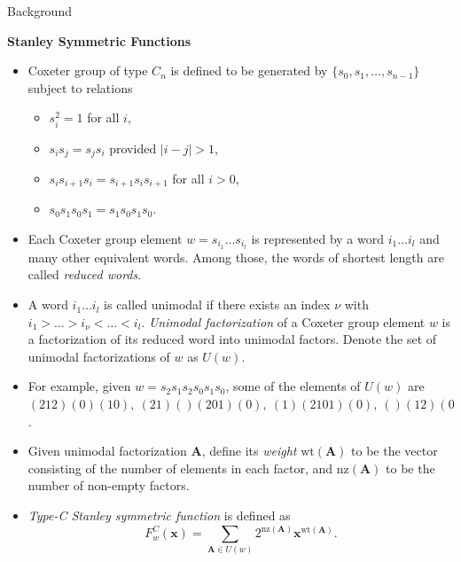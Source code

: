 \documentclass[final]{beamer}
\theoremstyle{definition}
\numberwithin{equation}{section}
\newcommand{\wt}{\mathrm{wt}}
\newcommand{\nz}{\mathrm{nz}}
\newlength{\onecolwid}
\newlength{\twocolwid}
\begin{document}
\begin{frame}[t]
\begin{columns}[t]
\begin{column}{\twocolwid}
\begin{columns}[t]
\begin{column}{\onecolwid}
\begin{block}{Background}

\textbf{Stanley Symmetric Functions}
\begin{itemize}
\item Coxeter group of type $C_n$ is defined to be generated by $\{s_0, s_1, \ldots, s_{n-1}\}$ subject to relations
	\begin{itemize}
	\item $s_i^2 = 1$ for all $i$,  
	\item $s_i s_j = s_j s_i$ provided $|i-j|>1$, 
	\item $s_i s_{i+1} s_i = s_{i+1} s_i s_{i+1}$ for all $i>0$,
	\item $s_0 s_1 s_0 s_1 = s_1 s_0 s_1 s_0$.
	\end{itemize}
\item Each Coxeter group element $w=s_{i_1}\ldots s_{i_l}$ is represented by a word $i_1\ldots i_l$ and many other equivalent words. Among those, the words of shortest length are called \textit{reduced words}.

\item A word $i_1\ldots i_l$ is called unimodal if there exists an index $\nu$ with $i_1 > \ldots > i_\nu < \ldots < i_l$.  \textit{Unimodal factorization} of a Coxeter group element $w$ is a factorization of its reduced word into unimodal factors. Denote the set of unimodal factorizations of $w$ as $U(w)$.

\item For example, given $w=s_2 s_1 s_2 s_0 s_1 s_0$, some of the elements of $U(w)$ are $(212)(0)(10),\ (21)()(201)(0),\ (1)(2101)(0),\ ()(12)(01)(01)$.

\item Given unimodal factorization $\mathbf{A}$, define its \textit{weight} $\wt(\mathbf{A})$ to be the vector 
consisting of the number of elements in each factor, and $\nz(\mathbf{A})$ to be the number of non-empty factors.

\item \textit{Type-C Stanley symmetric function} is defined as 
$$F^C_w(\mathbf{x}) = \sum_{\mathbf{A} \in U(w)} 2^{\nz(\mathbf{A})} \mathbf{x}^{\wt(\mathbf{A})}.$$
\end{itemize}


\end{block}
\end{column}
\end{columns}
\end{column}
\end{columns}
\end{frame}
\end{document}
